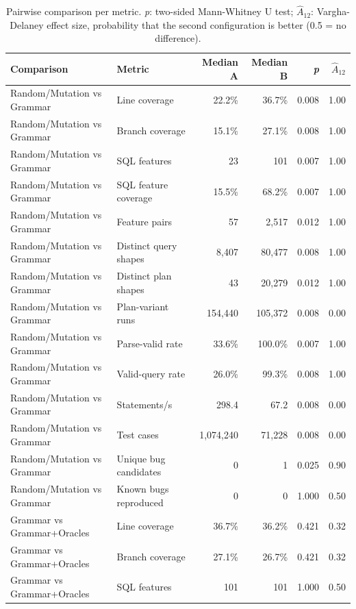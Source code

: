 \begin{table}[t]
  \caption{Pairwise comparison per metric. \emph{p}: two-sided Mann-Whitney U test; \emph{$\hat{A}_{12}$}: Vargha-Delaney effect size, probability that the second configuration is better (0.5 = no difference).}
  \label{tab:rq1-comparison}
  \footnotesize
  \begin{tabular}{llrrrr}
    \toprule
    Comparison & Metric & Median A & Median B & \emph{p} & $\hat{A}_{12}$ \\
    \midrule
    Random/Mutation vs Grammar & Line coverage & 22.2\% & 36.7\% & 0.008 & 1.00 \\
    Random/Mutation vs Grammar & Branch coverage & 15.1\% & 27.1\% & 0.008 & 1.00 \\
    Random/Mutation vs Grammar & SQL features & 23 & 101 & 0.007 & 1.00 \\
    Random/Mutation vs Grammar & SQL feature coverage & 15.5\% & 68.2\% & 0.007 & 1.00 \\
    Random/Mutation vs Grammar & Feature pairs & 57 & 2{,}517 & 0.012 & 1.00 \\
    Random/Mutation vs Grammar & Distinct query shapes & 8{,}407 & 80{,}477 & 0.008 & 1.00 \\
    Random/Mutation vs Grammar & Distinct plan shapes & 43 & 20{,}279 & 0.012 & 1.00 \\
    Random/Mutation vs Grammar & Plan-variant runs & 154{,}440 & 105{,}372 & 0.008 & 0.00 \\
    Random/Mutation vs Grammar & Parse-valid rate & 33.6\% & 100.0\% & 0.007 & 1.00 \\
    Random/Mutation vs Grammar & Valid-query rate & 26.0\% & 99.3\% & 0.008 & 1.00 \\
    Random/Mutation vs Grammar & Statements/s & 298.4 & 67.2 & 0.008 & 0.00 \\
    Random/Mutation vs Grammar & Test cases & 1{,}074{,}240 & 71{,}228 & 0.008 & 0.00 \\
    Random/Mutation vs Grammar & Unique bug candidates & 0 & 1 & 0.025 & 0.90 \\
    Random/Mutation vs Grammar & Known bugs reproduced & 0 & 0 & 1.000 & 0.50 \\
    Grammar vs Grammar+Oracles & Line coverage & 36.7\% & 36.2\% & 0.421 & 0.32 \\
    Grammar vs Grammar+Oracles & Branch coverage & 27.1\% & 26.7\% & 0.421 & 0.32 \\
    Grammar vs Grammar+Oracles & SQL features & 101 & 101 & 1.000 & 0.50 \\

\end{tabular}
\end{table}
